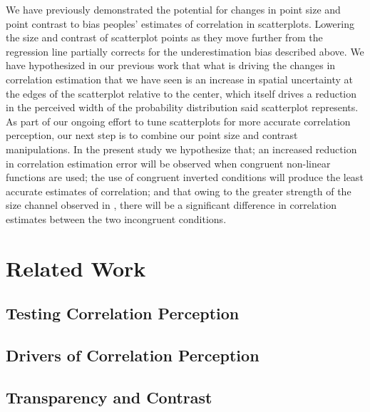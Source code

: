 \documentclass[manuscript, review, anonymous, screen]{acmart}
\begin{document}
We have previously demonstrated the potential for changes in point size
and point contrast to bias peoples' estimates of correlation in
scatterplots. Lowering the size and contrast of scatterplot points as
they move further from the regression line partially corrects for the
underestimation bias described above. We have hypothesized in our
previous work that what is driving the changes in correlation estimation
that we have seen is an increase in spatial uncertainty at the edges of
the scatterplot relative to the center, which itself drives a reduction
in the perceived width of the probability distribution said scatterplot
represents. As part of our ongoing effort to tune scatterplots for more
accurate correlation perception, our next step is to combine our point
size and contrast manipulations. In the present study we hypothesize
that; an increased reduction in correlation estimation error will be
observed when congruent non-linear functions are used; the use of
congruent inverted conditions will produce the least accurate estimates
of correlation; and that owing to the greater strength of the size
channel observed in \citet{strain_2023b}, there will be a significant
difference in correlation estimates between the two incongruent
conditions.

\hypertarget{sec-related-work}{%
\section{Related Work}\label{sec-related-work}}

\hypertarget{sec-testing-corr-percept}{%
\subsection{Testing Correlation
Perception}\label{sec-testing-corr-percept}}

\hypertarget{sec-drivers}{%
\subsection{Drivers of Correlation Perception}\label{sec-drivers}}

\hypertarget{sec-transparency-and-contrast}{%
\subsection{Transparency and
Contrast}\label{sec-transparency-and-contrast}}
\end{document}

